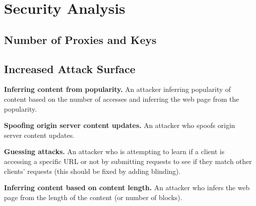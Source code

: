 \section{Security Analysis}
\label{sec:analysis}


\subsection{Number of Proxies and Keys}

\subsection{Increased Attack Surface}

{\bf Inferring content from popularity.}
An attacker inferring popularity of content based on the number of accesses and inferring the web page from the popularity.

{\bf Spoofing origin server content updates.}
An attacker who spoofs origin server content updates.

{\bf Guessing attacks.}
An attacker who is attempting to learn if a client is accessing a specific URL or not by submitting requests to see if they match other clients' requests (this should be fixed by adding blinding).

{\bf Inferring content based on content length.}
An attacker who infers the web page from the length of the content (or number of blocks).

